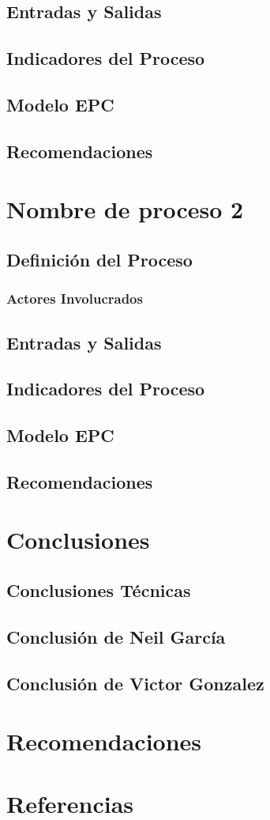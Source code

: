 \documentclass[12pt,letterpaper]{article}
\begin{document}
\subsection{Entradas y Salidas}
\subsection{Indicadores del Proceso}
\subsection{Modelo EPC}
\subsection{Recomendaciones}

\section{Nombre de proceso 2}
\subsection{Definición del Proceso}
\subsubsection{Actores Involucrados}
\subsection{Entradas y Salidas}
\subsection{Indicadores del Proceso}
\subsection{Modelo EPC}
\subsection{Recomendaciones}

\section{Conclusiones}
\subsection{Conclusiones Técnicas}
\subsection{Conclusión de Neil García}
\subsection{Conclusión de Victor Gonzalez}

\section{Recomendaciones}

\section{Referencias}
\end{document}
